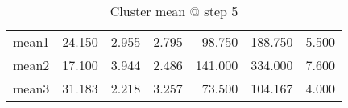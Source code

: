 \begin{table}[htbp]
  \centering
  \caption{Cluster mean @ step 5}
    \begin{tabular}{rrrrrrr}
    \toprule
    mean1 & 24.150  & 2.955  & 2.795  & 98.750  & 188.750  & 5.500  \\
    mean2 & 17.100  & 3.944  & 2.486  & 141.000  & 334.000  & 7.600  \\
    mean3 & 31.183  & 2.218  & 3.257  & 73.500  & 104.167  & 4.000  \\
    \bottomrule
    \end{tabular}%
  \label{tab:mean_b5}%
\end{table}%
